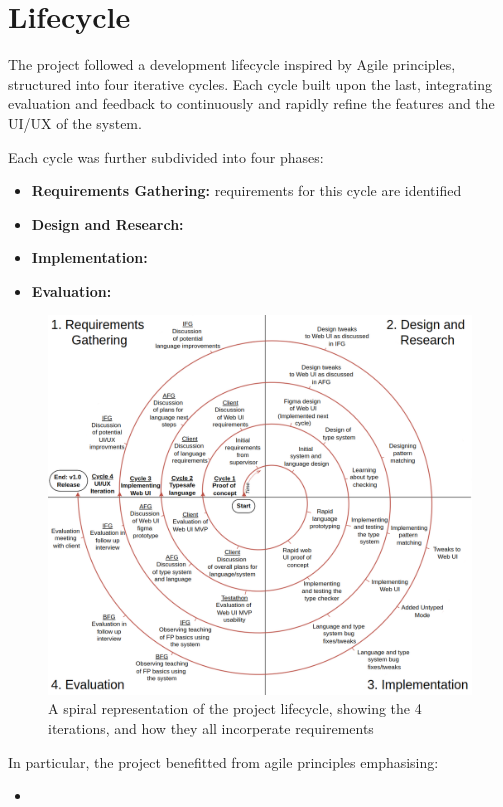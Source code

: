 \chapter{Lifecycle}
The project followed a development lifecycle inspired by Agile principles\cite{agilemanifesto2001}, structured into four iterative cycles. Each cycle built upon the last, integrating evaluation and feedback to continuously and rapidly refine the features and the UI/UX of the system. 

Each cycle was further subdivided into four phases:

\begin{itemize}
    \item \textbf{Requirements Gathering:} requirements for this cycle are identified
    \item \textbf{Design and Research:}
    \item \textbf{Implementation:}
    \item \textbf{Evaluation:}
\end{itemize}

\begin{figure}[htbp]
    \centering
    \includegraphics[width=\linewidth]{images/spiral1.drawio.png}
    \caption{A spiral representation of the project lifecycle, showing the 4 iterations, and how they all incorperate requirements }\label{fig:spiral}
\end{figure}

In particular, the project benefitted from agile principles emphasising:
\begin{itemize}
    \item 
\end{itemize}


